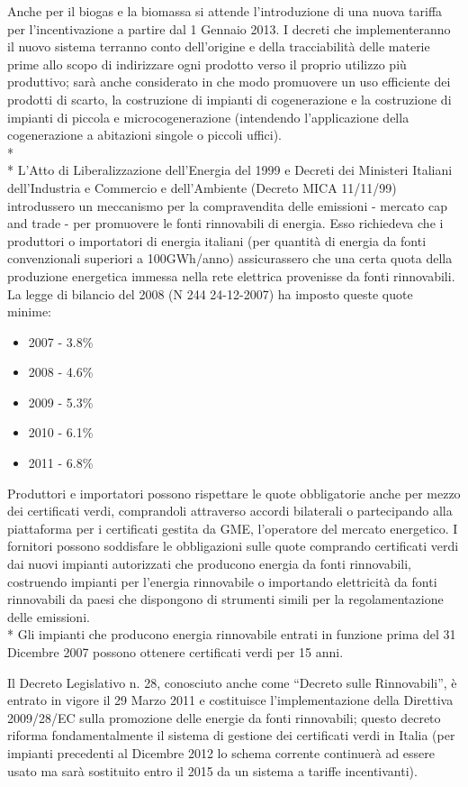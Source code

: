 \documentclass[12pt,a4paper,openright,twoside]{report}
\begin{document}
Anche per il biogas e la biomassa si attende l'introduzione di una nuova tariffa per l'incentivazione a partire dal 1 Gennaio 2013. I decreti che implementeranno il nuovo sistema terranno conto dell'origine e della tracciabilità delle materie prime allo scopo di indirizzare ogni prodotto verso il proprio utilizzo più produttivo; sarà anche considerato in che modo promuovere un uso efficiente dei prodotti di scarto, la costruzione di impianti di cogenerazione e la costruzione di impianti di piccola e microcogenerazione (intendendo l'applicazione della cogenerazione a abitazioni singole o piccoli uffici).
\\*\\*
L'Atto di Liberalizzazione dell'Energia del 1999 e Decreti dei Ministeri Italiani dell'Industria e Commercio e dell'Ambiente (Decreto MICA 11/11/99) introdussero un meccanismo per la compravendita delle emissioni - mercato cap and trade - per promuovere le fonti rinnovabili di energia. Esso richiedeva che i produttori o importatori di energia italiani (per quantità di energia da fonti convenzionali superiori a 100GWh/anno) assicurassero che una certa quota della produzione energetica immessa nella rete elettrica provenisse da fonti rinnovabili. La legge di bilancio del 2008 (N 244 24-12-2007) ha imposto queste quote minime: 
\begin{itemize}
\item 2007 - 3.8\%
\item 2008 - 4.6\%
\item 2009 - 5.3\%
\item 2010 - 6.1\%
\item 2011 - 6.8\%
\end{itemize}
Produttori e importatori possono rispettare le quote obbligatorie anche per mezzo dei certificati verdi, comprandoli attraverso accordi bilaterali o partecipando alla piattaforma per i certificati gestita da GME, l'operatore del mercato energetico. I fornitori possono soddisfare le obbligazioni sulle quote comprando certificati verdi dai nuovi impianti autorizzati che producono energia da fonti rinnovabili, costruendo impianti per l'energia rinnovabile o importando elettricità da fonti rinnovabili da paesi che dispongono di strumenti simili per la regolamentazione delle emissioni.\\*
Gli impianti che producono energia rinnovabile entrati in funzione prima del 31 Dicembre 2007 possono ottenere certificati verdi per 15 anni.

Il Decreto Legislativo n. 28, conosciuto anche come ``Decreto sulle Rinnovabili'', è entrato in vigore il 29 Marzo 2011 e costituisce l'implementazione della Direttiva 2009/28/EC sulla promozione delle energie da fonti rinnovabili; questo decreto riforma fondamentalmente il sistema di gestione dei certificati verdi in Italia (per impianti precedenti al Dicembre 2012 lo schema corrente continuerà ad essere usato ma sarà sostituito entro il 2015 da un sistema a tariffe incentivanti).
\end{document}

